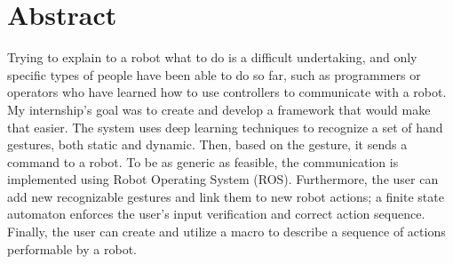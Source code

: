 \documentclass[../thesis.tex]{subfiles}
\begin{document}
    \cleardoublepage
    \begingroup
    \let\clearpage\relax
    \let\cleardoublepage\relax

    \chapter*{Abstract}
    Trying to explain to a robot what to do is a difficult undertaking, and only specific types of people have been able to do so far, such as programmers or operators who have learned how to use controllers to communicate with a robot. My internship's goal was to create and develop a framework that would make that easier. The system uses deep learning techniques to recognize a set of hand gestures, both static and dynamic. Then, based on the gesture, it sends a command to a robot. To be as generic as feasible, the communication is implemented using Robot Operating System (ROS). Furthermore, the user can add new recognizable gestures and link them to new robot actions; a finite state automaton enforces the user's input verification and correct action sequence. Finally, the user can  create and utilize a macro to describe a sequence of actions performable by a robot.

    \endgroup

    \vfill
\end{document}
